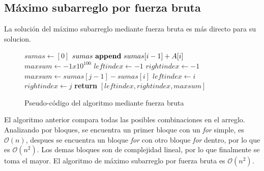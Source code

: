 \documentclass[12pt,twoside]{article}
\begin{document}
\subsection{M\'aximo subarreglo por fuerza bruta}
La soluci\'on del m\'aximo subarreglo mediante fuerza bruta es m\'as directo para su solucion.
\begin{figure}[h]
    \centering
    \begin{algorithmic}
            \State $sumas \longleftarrow [0]$
                \State $sumas \text{ \textbf{append} } sumas[ i - 1] + A[i]$
            \EndFor
            \State $maxsum \longleftarrow -1x10^100$
            \State $leftindex \longleftarrow -1$
            \State $rightindex \longleftarrow -1$
                        \State $maxsum \longleftarrow sumas[j-1] - sumas[i]$
                        \State $leftindex \longleftarrow i$
                        \State $rightindex \longleftarrow j$
                    \EndIf
                \EndFor
            \EndFor
            \State \textbf{return} $[leftindex, rightindex, maxsum]$
        \EndProcedure
    \end{algorithmic}
    \caption{Pseudo-c\'odigo del algoritmo mediante fuerza bruta}
    \label{fig:bruta}
\end{figure}

El algoritmo anterior compara todas las posibles combinaciones en el arreglo. Analizando por bloques, se encuentra un primer bloque con un \textit{for} simple, es $\mathcal{O}(n)$, despues se encuentra un bloque \textit{for} con otro bloque \textit{for} dentro, por lo que es $\mathcal{O}(n^2)$. Los demas bloques son de complejidad lineal, por lo que finalmente se toma el mayor. El algoritmo de m\'aximo subarreglo por fuerza bruta es $\mathcal{O}(n^2)$.
\end{document}
